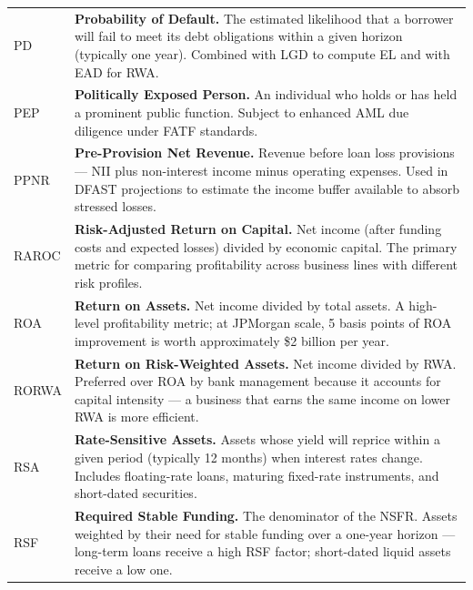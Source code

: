\documentclass[12pt,a4paper]{article}
\begin{document}
\begin{longtable}{p{3.2cm} p{10.8cm}}
  PD    & \textbf{Probability of Default.}
          The estimated likelihood that a borrower will fail to meet its
          debt obligations within a given horizon (typically one year).
          Combined with LGD to compute EL and with EAD for RWA. \\[4pt]

  PEP   & \textbf{Politically Exposed Person.}
          An individual who holds or has held a prominent public function.
          Subject to enhanced AML due diligence under FATF standards. \\[4pt]

  PPNR  & \textbf{Pre-Provision Net Revenue.}
          Revenue before loan loss provisions --- NII plus non-interest income
          minus operating expenses.  Used in DFAST projections to estimate the
          income buffer available to absorb stressed losses. \\[4pt]

  RAROC & \textbf{Risk-Adjusted Return on Capital.}
          Net income (after funding costs and expected losses) divided by
          economic capital.  The primary metric for comparing profitability
          across business lines with different risk profiles. \\[4pt]

  ROA   & \textbf{Return on Assets.}
          Net income divided by total assets.  A high-level profitability
          metric; at JPMorgan scale, 5 basis points of ROA improvement is
          worth approximately \$2 billion per year. \\[4pt]

  RORWA & \textbf{Return on Risk-Weighted Assets.}
          Net income divided by RWA.  Preferred over ROA by bank management
          because it accounts for capital intensity --- a business that earns
          the same income on lower RWA is more efficient. \\[4pt]

  RSA   & \textbf{Rate-Sensitive Assets.}
          Assets whose yield will reprice within a given period (typically
          12 months) when interest rates change.  Includes floating-rate
          loans, maturing fixed-rate instruments, and short-dated securities. \\[4pt]

  RSF   & \textbf{Required Stable Funding.}
          The denominator of the NSFR.  Assets weighted by their need for
          stable funding over a one-year horizon --- long-term loans receive
          a high RSF factor; short-dated liquid assets receive a low one. \\[4pt]


\end{longtable}
\end{document}
